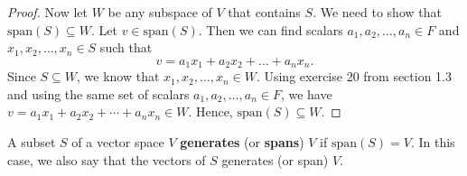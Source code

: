 \begin{proof}
Now let \( W  \) be any subspace of \( V  \) that contains \( S  \).  We need to show that \( \text{span}(S) \subseteq W  \). Let \( v \in \text{span}(S) \). Then we can find scalars \( a_{1}, a_{2}, \dots, a_{n} \in F    \) and \( x_{1} , x_{2} , \dots, x_{n} \in S  \) such that 
\[  v = a_{1} x_{1} + a_{2} x_{2} + \dots + a_{n} x_{n}.   \]
Since \( S \subseteq W  \), we know that \( x_{1}, x_{2} , \dots , x_{n} \in W  \). Using exercise 20 from section 1.3 and using the same set of scalars \( a_{1}, a_{2}, \dots, a_{n} \in F  \), we have \( v = a_{1} x_{1} + a_{2} x_{2} + \cdots + a_{n} x_{n} \in W  \). Hence, \( \text{span}(S) \subseteq W  \).
\end{proof}

\begin{definition}[ ]
    A subset \( S  \) of a vector space \( V  \) \textbf{generates} (or \textbf{spans}) \( V  \) if \( \text{span}(S) = V  \). In this case, we also say that the vectors of \( S  \) generates (or span) \( V  \).
\end{definition}





